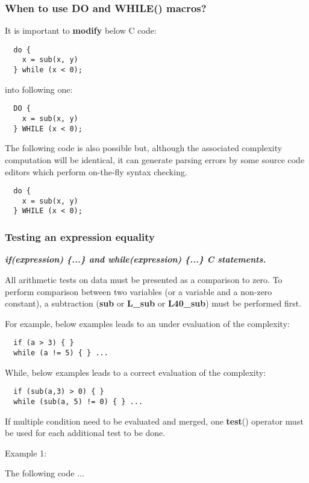 \subsubsection{When to use DO and WHILE() macros?}
It is important to \textbf{modify} below C code:
{\small
\begin{verbatim}
  do {
    x = sub(x, y)
  } while (x < 0);
\end{verbatim}}
into following one: \\
{\small
\begin{verbatim}
  DO {
    x = sub(x, y)
  } WHILE (x < 0);
\end{verbatim}}

The following code is also possible but, although the associated
complexity computation will be identical, it can generate parsing
errors by some source code editors which perform on-the-fly syntax
checking.
{\small
\begin{verbatim}
  do {
    x = sub(x, y)
  } WHILE (x < 0);
\end{verbatim}}

\subsubsection {Testing an expression equality}

\textbf{\emph{if(expression) \{...\} and while(expression) \{...\}
C statements.}}

All arithmetic tests on data must be presented as a comparison to
zero. To perform comparison between two variables (or a variable
and a non-zero constant), a subtraction (\textbf{sub} or
\textbf{L\_sub} or \textbf{L40\_sub}) must be performed first.

For example, below examples leads to an under evaluation of the
complexity:
{\small
\begin{verbatim}
  if (a > 3) { }
  while (a != 5) { } ...
\end{verbatim}}

While, below examples leads to a correct evaluation of the
complexity: 
{\small
\begin{verbatim}
  if (sub(a,3) > 0) { }
  while (sub(a, 5) != 0) { } ...
\end{verbatim}}

If multiple condition need to be evaluated and merged, one
\textbf{test}() operator must be used for each additional test to be
done.

Example 1:

The following code ...

